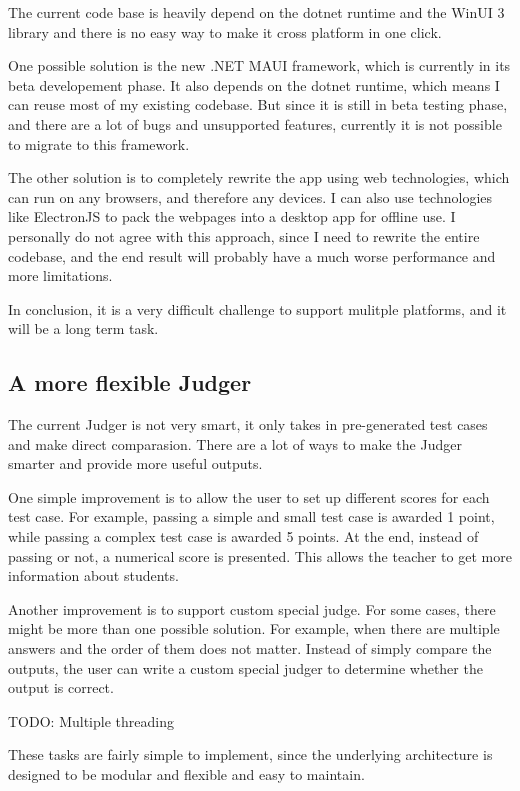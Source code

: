 \documentclass[a4paper]{report}
\begin{document}
The current code base is heavily depend on the dotnet runtime and the WinUI 3 library and there is no easy way to make it cross platform in one click.

One possible solution is the new .NET MAUI framework\cite{microsoft:docs:what-is-maui}, which is currently in its beta developement phase. It also depends on the dotnet runtime, which means I can reuse most of my existing codebase. But since it is still in beta testing phase, and there are a lot of bugs and unsupported features, currently it is not possible to migrate to this framework.

The other solution is to completely rewrite the app using web technologies, which can run on any browsers, and therefore any devices. I can also use technologies like ElectronJS\cite{electron} to pack the webpages into a desktop app for offline use. I personally do not agree with this approach, since I need to rewrite the entire codebase, and the end result will probably have a much worse performance and more limitations.

In conclusion, it is a very difficult challenge to support mulitple platforms, and it will be a long term task.

\subsection{A more flexible Judger}

The current Judger is not very smart, it only takes in pre-generated test cases and make direct comparasion. There are a lot of ways to make the Judger smarter and provide more useful outputs.

One simple improvement is to allow the user to set up different scores for each test case. For example, passing a simple and small test case is awarded 1 point, while passing a complex test case is awarded 5 points. At the end, instead of passing or not, a numerical score is presented. This allows the teacher to get more information about students.

Another improvement is to support custom special judge. For some cases, there might be more than one possible solution. For example, when there are multiple answers and the order of them does not matter. Instead of simply compare the outputs, the user can write a custom special judger to determine whether the output is correct.

TODO: Multiple threading

These tasks are fairly simple to implement, since the underlying architecture is designed to be modular and flexible and easy to maintain.
\end{document}
